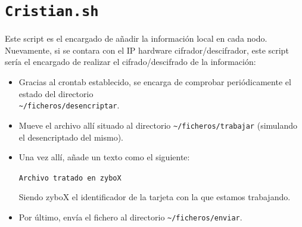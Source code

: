 \section{\texttt{Cristian.sh}}
\hypertarget{ScriptCristian}{}
Este script es el encargado de añadir la información local en cada nodo. Nuevamente, si se contara con el IP hardware cifrador/descifrador, este script sería el encargado de realizar el cifrado/descifrado de la información:
\begin{itemize}
	\item Gracias al crontab establecido, se encarga de comprobar periódicamente el estado del directorio\\ \texttt{\textasciitilde/ficheros/desencriptar}.
	\item Mueve el archivo allí situado al directorio \texttt{\textasciitilde/ficheros/trabajar} (simulando el desencriptado del mismo).
	\item Una vez allí, añade un texto como el siguiente:
	\begin{center}
		\texttt{Archivo tratado en zyboX}
	\end{center}	
	Siendo zyboX el identificador de la tarjeta con la que estamos trabajando.
	\item Por último, envía el fichero al directorio \texttt{\textasciitilde/ficheros/enviar}.
\end{itemize}

\newpage
